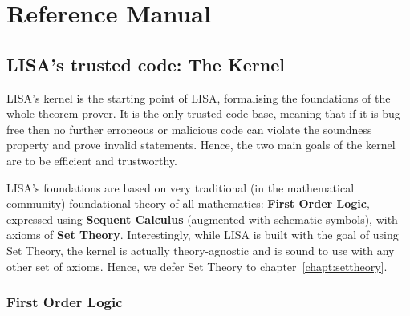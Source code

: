 \newcommand\Var{\operatorname{Var}}
\newcommand\FormulaVar{\operatorname{FormulaVar}}
\newcommand\List{\operatorname{List}}
\newcommand\Lambdaa{\operatorname{Lambda}}
\newcommand\LambdaTT{\operatorname{LambdaTermTerm}}
\newcommand\LambdaTF{\operatorname{LambdaTermFormula}}
\newcommand\LambdaFF{\operatorname{LambdaFormulaFormula}}

\part{Reference Manual}
\label{part:manual}
\chapter{LISA's trusted code: The Kernel}
\label{chapt:kernel}
LISA's kernel is the starting point of LISA, formalising the foundations of the whole theorem prover. It is the only trusted code base, meaning that if it is bug-free then no further erroneous or malicious code can violate the soundness property and prove invalid statements. Hence, the two main goals of the kernel are to be efficient and trustworthy.


LISA's foundations are based on very traditional (in the mathematical community) foundational theory of all mathematics: \textbf{First Order Logic}, expressed using \textbf{Sequent Calculus} (augmented with schematic symbols), with axioms of \textbf{Set Theory}.
Interestingly, while LISA is built with the goal of using Set Theory, the kernel is actually theory-agnostic and is sound to use with any other set of axioms. Hence, we defer Set Theory to chapter~\ref{chapt:settheory}.

\section{First Order Logic}
\label{sect:FOL}
